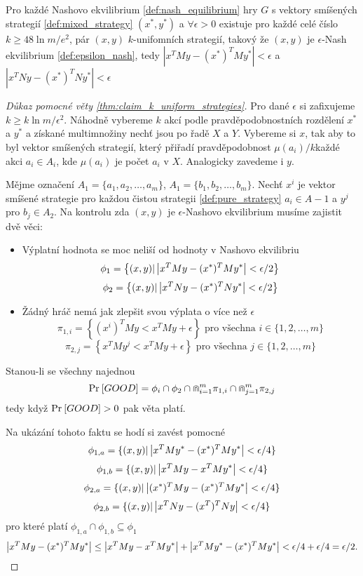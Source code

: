 \begin{theorem}
\label{thm:claim_k_uniform_strategies}
Pro každé Nashovo ekvilibrium \ref{def:nash_equilibrium} hry $G$ s vektory smíšených strategií \ref{def:mixed_strategy} $(x^*, y^*)$ a $\forall \epsilon > 0$ existuje pro každé celé číslo $k \geq 48 \ln m/e^2$, pár $(x,y)$ $k$-unifomních strategií, takový že $(x,y)$ je $\epsilon$-Nash ekvilibrium \ref{def:epsilon_nash}, tedy $|x^T M y - (x^*)^T M y^*| < \epsilon$ a $|x^T N y - (x^*)^T N y^*| < \epsilon$
\end{theorem}
\begin{proof}[Důkaz pomocné věty \ref{thm:claim_k_uniform_strategies}]
    Pro dané $\epsilon$ si zafixujeme $k \geq k \ln m / \epsilon^2$.
    Náhodně vybereme $k$ akcí podle pravděpodobnostních rozdělení $x^*$ a $y^*$ a získané multimnožiny nechť jsou po řadě $X$ a $Y$. 
    Vybereme si $x$, tak aby to byl vektor smíšených strategií, který přiřadí pravděpodobnost $\mu (a_i)/k$každé akci $a_i \in A_i$, kde $\mu(a_i)$ je počet $a_i$ v $X$. 
    Analogicky zavedeme i $y$. 

    Mějme označení $A_1 = \{a_1, a_2, \dots, a_m\}$, $A_1 = \{b_1, b_2, \dots, b_m\}$. 
    Nechť $x^i$ je vektor smíšené strategie pro každou čistou strategii \ref{def:pure_strategy} $a_i \in A-1$ a $y^j$ pro $b_j \in A_2$. 
    Na kontrolu zda $(x,y)$ je $\epsilon$-Nashovo ekvilibrium musíme zajistit dvě věci:
\begin{itemize}
    \item Výplatní hodnota se moc neliší od hodnoty v Nashovo ekvilibriu
        $$
            \phi_1 = \left\{ (x,y) | \left|x^T M y - (x^*)^T M y^*\right| < \epsilon /2 \right\} 
        $$ 
        $$ 
            \phi_2 = \left\{ (x,y) | \left|x^T N y - (x^*)^T N y^*\right| < \epsilon /2 \right\}
        $$ 
    \item Žádný hráč nemá jak zlepšit svou výplata o více než $\epsilon$
        $$ 
        \pi_{1,i} = \left\{ (x^i)^T M y < x^T M y + \epsilon\right\} \text{ pro všechna } i \in \{1,2, \dots, m\}
        $$ 
        $$ 
        \pi_{2,j} = \left\{ x^T M y^j < x^T M y + \epsilon\right\} \text{ pro všechna } j \in \{1,2, \dots, m\}
        $$ 
\end{itemize}
Stanou-li se všechny najednou 
$$ 
\text{Pr}_{}\left[GOOD\right] = \phi_i \cap \phi_2 \cap \Cap^m_{i=1} \pi_{1,i} \cap \Cap^m_{j=1} \pi_{2,j} 
$$ 
tedy když $\text{Pr}_{}\left[GOOD\right] > 0$ pak věta platí. 

Na ukázání tohoto faktu se hodí si zavést pomocné 
$$ 
\phi_{1,a} = \{(x,y) | \left|x^T M y^* - (x^*)^T M y^*\right| < \epsilon/4 \}
$$ 
$$ 
\phi_{1,b} = \{(x,y) | \left|x^T M y - x^T M y^*\right| < \epsilon/4 \}
$$ 
$$ 
\phi_{2,a} = \{(x,y) | \left|(x^*)^T M y - (x^*)^T M y^*\right| < \epsilon/4 \}
$$ 
$$ 
\phi_{2,b} = \{(x,y) | \left|x^T N y -  (x^T)^T N y\right| < \epsilon/4 \}
$$ 
pro které platí $\phi_{1,a} \cap \phi_{1,b} \subseteq \phi_1$ 
$$ 
\left|x^T M y - (x^*)^T M y^*\right| \leq \left|x^T M y - x^T M y^*\right| + \left|x^T M y^* - (x^*)^T M y^*\right| < \epsilon/4 + \epsilon/4 = \epsilon/2.
$$


\end{proof}
